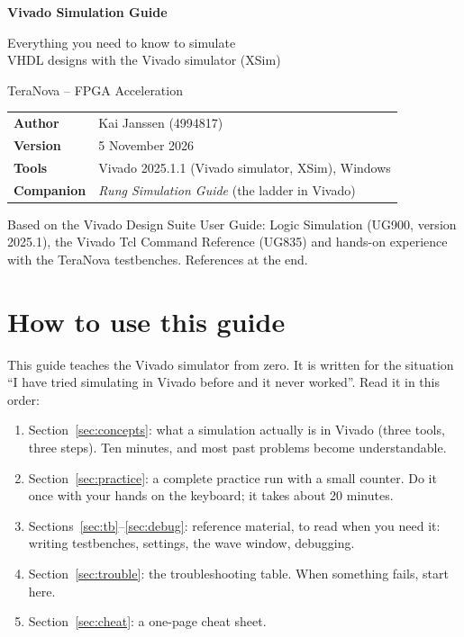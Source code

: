 \documentclass[11pt,a4paper]{article}
\renewcommand{\_}{\oldunderscore\allowbreak{}}
\begin{document}
\begin{titlepage}
\centering
\vspace*{3cm}
{\LARGE\bfseries Vivado Simulation Guide\par}
\vspace{0.5cm}
{\Large Everything you need to know to simulate\\VHDL designs with the Vivado simulator (XSim)\par}
\vspace{0.3cm}
{\large TeraNova -- FPGA Acceleration\par}
\vspace{2cm}
\begin{tabular}{@{}ll@{}}
\textbf{Author}   & Kai Janssen (4994817) \\
\textbf{Version}  & 5 November 2026 \\
\textbf{Tools}    & Vivado 2025.1.1 (Vivado simulator, XSim), Windows \\
\textbf{Companion}& \emph{Rung Simulation Guide} (the ladder in Vivado) \\
\end{tabular}
\vfill
{\small Based on the Vivado Design Suite User Guide: Logic Simulation (UG900, version 2025.1), the Vivado Tcl Command Reference (UG835) and hands-on experience with the TeraNova testbenches. References at the end.\par}
\end{titlepage}

\tableofcontents
\newpage

\section{How to use this guide}
This guide teaches the Vivado simulator from zero. It is written for the situation ``I have tried simulating in Vivado before and it never worked''. Read it in this order:

\begin{enumerate}[nosep]
  \item Section~\ref{sec:concepts}: what a simulation actually is in Vivado (three tools, three steps). Ten minutes, and most past problems become understandable.
  \item Section~\ref{sec:practice}: a complete practice run with a small counter. Do it once with your hands on the keyboard; it takes about 20 minutes.
  \item Sections~\ref{sec:tb}--\ref{sec:debug}: reference material, to read when you need it: writing testbenches, settings, the wave window, debugging.
  \item Section~\ref{sec:trouble}: the troubleshooting table. When something fails, start here.
  \item Section~\ref{sec:cheat}: a one-page cheat sheet.
\end{enumerate}
\end{document}
